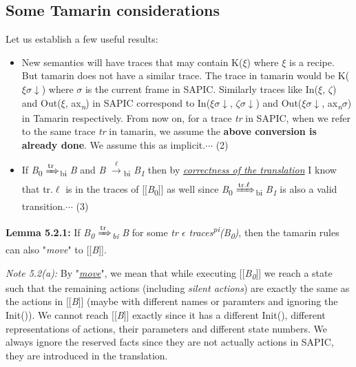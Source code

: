 \documentclass[11pt]{article}
\begin{document}
\subsection{Some Tamarin considerations}
\vspace{8pt}
Let us establish a few useful results:
\begin{itemize}
  \item New semantics will have traces that may contain K($\xi$) where $\xi$ is a recipe. But tamarin does not have a similar trace. The trace in tamarin would be K($\xi$$\sigma$$\downarrow$) where $\sigma$ is the current frame in SAPIC. Similarly traces like In($\xi$, $\zeta$) and Out($\xi$, ax\textsubscript{{\it n}}) in SAPIC correspond to In($\xi$$\sigma$$\downarrow$, $\zeta$$\sigma$$\downarrow$) and Out($\xi$$\sigma$$\downarrow$, ax\textsubscript{{\it n}}$\sigma$) in Tamarin respectively. From now on, for a trace {\it tr} in SAPIC, when we refer to the same trace {\it tr} in tamarin, we assume the {\bf above conversion is already done}. We assume this as implicit.\hfill \hfill $\cdots$ (2)

  \item If {\it B}\textsubscript{0} {$\xRightarrow[\text{}]{\text{tr}}$}\textsubscript{bi} {\it B} and {\it B} {$\xrightarrow[\text{}]{\text{$\ell$}}$}{\textsubscript{bi}} {\it B\textsubscript{1}} then by \underline{{\it correctness of the translation}} I know that tr.$\ell$ is in the traces of [[{\it B}\textsubscript{0}]] as well since {\it B}\textsubscript{0} {$\xRightarrow[\text{}]{\text{tr.$\ell$}}$}\textsubscript{bi} {\it B\textsubscript{1}} is also a valid transition.\hfill \hfill $\cdots$ (3)\newline

\end{itemize}  

{\bf Lemma 5.2.1: }If {\it B\textsubscript{0} {$\xRightarrow[\text{}]{\text{tr}}$}\textsubscript{bi} B} for some {\it tr $\epsilon$ traces\textsuperscript{pi}(B\textsubscript{0})}, then the tamarin rules can also \hspace*{100pt} "{\it move}" to [[{\it B}]]. \newline

{\it Note 5.2(a):} By "\underline{{\it move}}", we mean that while executing [[{\it B\textsubscript{0}}]] we reach a state such that the remaining actions (including {\it silent actions}) are exactly the same as the actions in [[{\it B}]] (maybe with different names or paramters and ignoring the Init()). We cannot reach [[{\it B}]] exactly since it has a different Init(), different representations of actions, their parameters and different state numbers. We always ignore the reserved facts since they are not actually actions in SAPIC, they are introduced in the translation.\newline
\end{document}
